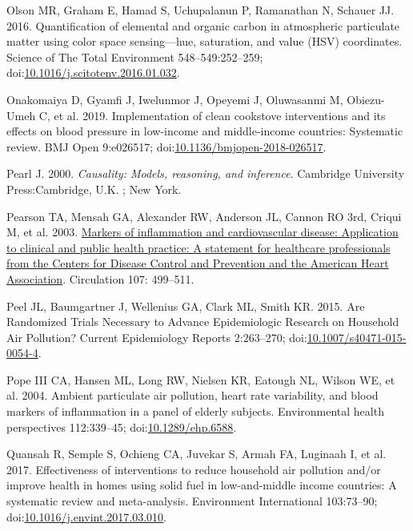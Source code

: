 \documentclass[
  letterpaper,
  DIV=11,
  numbers=noendperiod]{scrartcl}
\newlength{\cslhangindent}
\newenvironment{CSLReferences}[2] %
 {\begin{list}{}{%
  \setlength{\itemindent}{0pt}
  \setlength{\leftmargin}{0pt}
  \setlength{\parsep}{0pt}
  \ifodd #1
   \setlength{\leftmargin}{\cslhangindent}
   \setlength{\itemindent}{-1\cslhangindent}
  \fi
  \setlength{\itemsep}{#2\baselineskip}}}
 {\end{list}}
\begin{document}
\begin{CSLReferences}{1}{1}
Olson MR, Graham E, Hamad S, Uchupalanun P, Ramanathan N, Schauer JJ.
2016. Quantification of elemental and organic carbon in atmospheric
particulate matter using color space sensing---hue, saturation, and
value ({HSV}) coordinates. Science of The Total Environment
548--549:252--259;
doi:\href{https://doi.org/10.1016/j.scitotenv.2016.01.032}{10.1016/j.scitotenv.2016.01.032}.

Onakomaiya D, Gyamfi J, Iwelunmor J, Opeyemi J, Oluwasanmi M,
Obiezu-Umeh C, et al. 2019. Implementation of clean cookstove
interventions and its effects on blood pressure in low-income and
middle-income countries: Systematic review. BMJ Open 9:e026517;
doi:\href{https://doi.org/10.1136/bmjopen-2018-026517}{10.1136/bmjopen-2018-026517}.

Pearl J. 2000. \emph{Causality: Models, reasoning, and inference}.
Cambridge University Press:Cambridge, U.K. ; New York.

Pearson TA, Mensah GA, Alexander RW, Anderson JL, Cannon RO 3rd, Criqui
M, et al. 2003.
\href{https://www.ncbi.nlm.nih.gov/pubmed/12551878}{Markers of
inflammation and cardiovascular disease: Application to clinical and
public health practice: {A} statement for healthcare professionals from
the {Centers} for {Disease Control} and {Prevention} and the {American
Heart Association}}. Circulation 107: 499--511.

Peel JL, Baumgartner J, Wellenius GA, Clark ML, Smith KR. 2015. Are
{Randomized Trials Necessary} to {Advance Epidemiologic Research} on
{Household Air Pollution}? Current Epidemiology Reports 2:263--270;
doi:\href{https://doi.org/10.1007/s40471-015-0054-4}{10.1007/s40471-015-0054-4}.

Pope III CA, Hansen ML, Long RW, Nielsen KR, Eatough NL, Wilson WE, et
al. 2004. Ambient particulate air pollution, heart rate variability, and
blood markers of inflammation in a panel of elderly subjects.
Environmental health perspectives 112:339--45;
doi:\href{https://doi.org/10.1289/ehp.6588}{10.1289/ehp.6588}.

Quansah R, Semple S, Ochieng CA, Juvekar S, Armah FA, Luginaah I, et al.
2017. Effectiveness of interventions to reduce household air pollution
and/or improve health in homes using solid fuel in low-and-middle income
countries: {A} systematic review and meta-analysis. Environment
International 103:73--90;
doi:\href{https://doi.org/10.1016/j.envint.2017.03.010}{10.1016/j.envint.2017.03.010}.


\end{CSLReferences}
\end{document}
